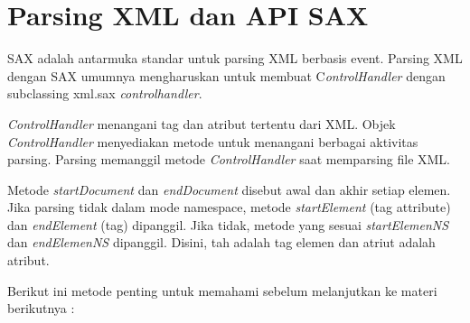 \documentclass{wileySix}
\begin{document}
\section{Parsing XML dan API SAX}
\par
\noindent 
\hspace*{0.5in} SAX adalah antarmuka standar untuk parsing XML berbasis event. Parsing XML dengan SAX umumnya mengharuskan untuk membuat C\textit{ontrolHandler }dengan subclassing xml.sax \textit{controlhandler}. \par
\noindent 
\hspace*{0.5in} \textit{ControlHandler }menangani tag dan atribut tertentu dari XML. Objek \textit{ControlHandler }menyediakan metode untuk menangani berbagai aktivitas parsing. Parsing memanggil metode \textit{ControlHandler }saat memparsing file XML. \par
\noindent 
\hspace*{0.5in} Metode \textit{startDocument} dan \textit{endDocument} disebut awal dan akhir setiap elemen. Jika parsing tidak dalam mode namespace, metode \textit{startElement} (tag attribute) dan \textit{endElement} (tag) dipanggil. Jika tidak, metode yang sesuai \textit{startElemenNS} dan \textit{endElemenNS} dipanggil. Disini, tah adalah tag elemen dan atriut adalah atribut.  \par
\noindent 
\hspace*{0.5in} Berikut ini metode penting untuk memahami sebelum melanjutkan ke materi berikutnya : \par
\noindent 
\end{document}
